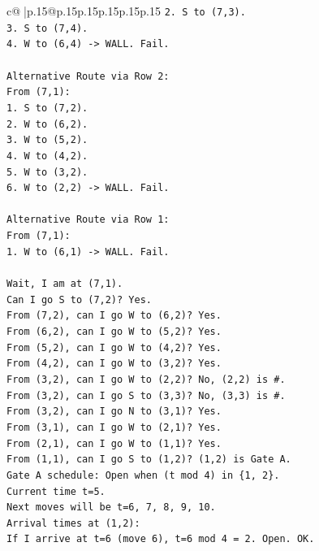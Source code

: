 \documentclass{article}
\begin{document}
{\begin{supertabular}{c@{$\;$}|p{.15\linewidth}@{}p{.15\linewidth}p{.15\linewidth}p{.15\linewidth}p{.15\linewidth}p{.15\linewidth}}
{{{\texttt{2. S to (7,3).} \\
\texttt{3. S to (7,4).} \\
\texttt{4. W to (6,4) {-}> WALL. Fail.} \\
\\ 
\texttt{Alternative Route via Row 2:} \\
\texttt{From (7,1):} \\
\texttt{1. S to (7,2).} \\
\texttt{2. W to (6,2).} \\
\texttt{3. W to (5,2).} \\
\texttt{4. W to (4,2).} \\
\texttt{5. W to (3,2).} \\
\texttt{6. W to (2,2) {-}> WALL. Fail.} \\
\\ 
\texttt{Alternative Route via Row 1:} \\
\texttt{From (7,1):} \\
\texttt{1. W to (6,1) {-}> WALL. Fail.} \\
\\ 
\texttt{Wait, I am at (7,1).} \\
\texttt{Can I go S to (7,2)? Yes.} \\
\texttt{From (7,2), can I go W to (6,2)? Yes.} \\
\texttt{From (6,2), can I go W to (5,2)? Yes.} \\
\texttt{From (5,2), can I go W to (4,2)? Yes.} \\
\texttt{From (4,2), can I go W to (3,2)? Yes.} \\
\texttt{From (3,2), can I go W to (2,2)? No, (2,2) is \#.} \\
\texttt{From (3,2), can I go S to (3,3)? No, (3,3) is \#.} \\
\texttt{From (3,2), can I go N to (3,1)? Yes.} \\
\texttt{From (3,1), can I go W to (2,1)? Yes.} \\
\texttt{From (2,1), can I go W to (1,1)? Yes.} \\
\texttt{From (1,1), can I go S to (1,2)? (1,2) is Gate A.} \\
\texttt{Gate A schedule: Open when (t mod 4) in \{1, 2\}.} \\
\texttt{Current time t=5.} \\
\texttt{Next moves will be t=6, 7, 8, 9, 10.} \\
\texttt{Arrival times at (1,2):} \\
\texttt{If I arrive at t=6 (move 6), t=6 mod 4 = 2. Open. OK.} \\
}}}
\end{supertabular}}
\end{document}
